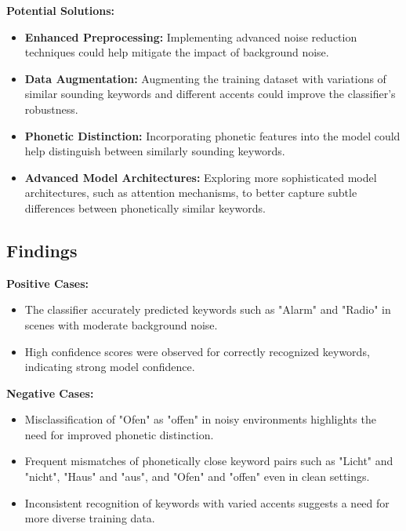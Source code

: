 \textbf{Potential Solutions:}
\begin{itemize}
    \item \textbf{Enhanced Preprocessing:} Implementing advanced noise reduction techniques could help mitigate the impact of background noise.
    \item \textbf{Data Augmentation:} Augmenting the training dataset with variations of similar sounding keywords and different accents could improve the classifier's robustness.
    \item \textbf{Phonetic Distinction:} Incorporating phonetic features into the model could help distinguish between similarly sounding keywords.
    \item \textbf{Advanced Model Architectures:} Exploring more sophisticated model architectures, such as attention mechanisms, to better capture subtle differences between phonetically similar keywords.
\end{itemize}

\subsection{Findings}

\textbf{Positive Cases:}
\begin{itemize}
    \item The classifier accurately predicted keywords such as "Alarm" and "Radio" in scenes with moderate background noise.
    \item High confidence scores were observed for correctly recognized keywords, indicating strong model confidence.
\end{itemize}

\textbf{Negative Cases:}
\begin{itemize}
    \item Misclassification of "Ofen" as "offen" in noisy environments highlights the need for improved phonetic distinction.
    \item Frequent mismatches of phonetically close keyword pairs such as "Licht" and "nicht", "Haus" and "aus", and "Ofen" and "offen" even in clean settings.
    \item Inconsistent recognition of keywords with varied accents suggests a need for more diverse training data.
\end{itemize}
